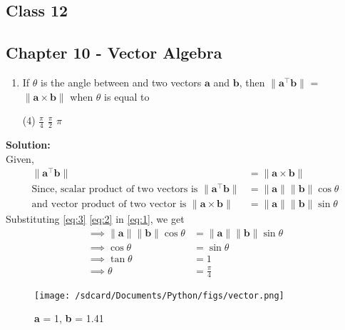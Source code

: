 \documentclass{article}
\newcommand{\norm}[1]{\lVert#1\rVert}
\renewcommand{\vec}[1]{\textbf{#1}}
\begin{document}
\onehalfspacing
\begin{center}
  \section*{\textbf{Class 12}}
  \subsection*{Chapter 10 - Vector Algebra}
\end{center}
\begin{enumerate}
  \item If $\theta$ is the angle between and two vectors $\vec{a}$ and $\vec{b}$, then $\norm{\vec{a}^{\top}\vec{b}}$ = $\norm{\vec{a}\times\vec{b}}$ when $\theta$ is equal to
    \begin{tasks}(4)
      \task $\frac{\pi}{4}$
      \task $\frac{\pi}{2}$
      \task $\pi$
      \end{tasks}
\end{enumerate}
  \textbf{Solution:}
  \\
Given,
\begin{align}
  \norm{\vec{a}^{\top}\vec{b}} &= \norm{\vec{a} \times \vec{b}} \label{eq:1}
  \\
  \text{Since, scalar product of two vectors is } \norm{\vec{a}^{\top}\vec{b}} &= \norm{\vec{a}}\norm{\vec{b}}\cos{\theta} \label{eq:2}
  \\
  \text{and vector product of two vector is }\norm{\vec{a} \times \vec{b}} &= \norm{\vec{a}}\norm{\vec{b}}\sin{\theta} \label{eq:3}
\end{align}
Substituting \eqref{eq:3} \eqref{eq:2} in \eqref{eq:1}, we get
\\
\begin{align}
  \implies \norm{\vec{a}}\norm{\vec{b}}\cos{\theta} &= \norm{\vec{a}}\norm{\vec{b}}\sin{\theta}\\
  \implies \cos{\theta} &= \sin{\theta}\\
  \implies \tan{\theta} &= 1\\
  \implies \theta &= \frac{\pi}{4}
\end{align}
\begin{figure}
  \begin{center}
    \texttt{[image: /sdcard/Documents/Python/figs/vector.png]}
  \end{center}
	\caption{\vec{a} = 1, \vec{b} = 1.41}
  \label{fig:12.10.5.19}
\end{figure}
\end{document}
